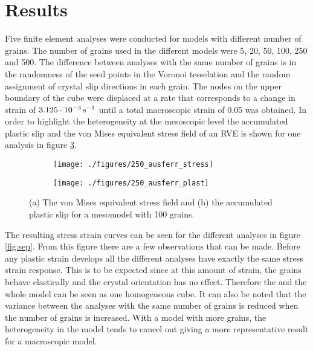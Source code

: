 \documentclass[crystal_plast.tex]{subfiles}
\begin{document}
\section{Results}

Five finite element analyses were conducted for models with different number of grains. The number of grains used in the different models were 5, 20, 50, 100, 250 and 500. The difference between analyses with the same number of grains is in the randomness of the seed points in the Voronoi tesselation and the random assignment of crystal slip directions in each grain.  The nodes on the upper boundary of the cube were displaced at a rate that corresponds to a change in strain of $\unit[3.125 \cdot 10^{-3}]{s^{-1}}$ until a total macroscopic strain of 0.05 was obtained. In order to highlight the heterogeneity at the mesoscopic level the accumulated plastic slip and the von Mises equivalent stress field of an RVE is shown for one analysis in figure \ref{fig:ausferr_col}. 

\begin{figure}[htpb!]
\centering
\begin{subfigure}{.8\textwidth}
  \centering
  \texttt{[image: ./figures/250\_ausferr\_stress]}
  \caption{}
  \label{fig:ausferr_stress}
\end{subfigure}%

\begin{subfigure}{.8\textwidth}
  \centering
  \texttt{[image: ./figures/250\_ausferr\_plast]}
  \caption{}
  \label{fig:ausferr_plast}
\end{subfigure}
\caption{(a) The von Mises equivalent stress field and (b) the accumulated plastic slip for a mesomodel with 100 grains.}
\label{fig:ausferr_col}
\end{figure}


The resulting stress strain curves can be seen for the different analyses in figure \ref{fig:sep}. From this figure there are a few observations that can be made. Before any plastic strain develops all the different analyses have exactly the same stress strain response. This is to be expected since at this amount of strain, the grains behave elastically and the crystal orientation has no effect. Therefore the and the whole model can be seen as one homogeneous cube. It can also be noted that the variance between the analyses with the same number of grains is reduced when the number of grains is increased. With a model with more grains, the heterogeneity in the model tends to cancel out giving a more representative result for a macroscopic model.
\end{document}
